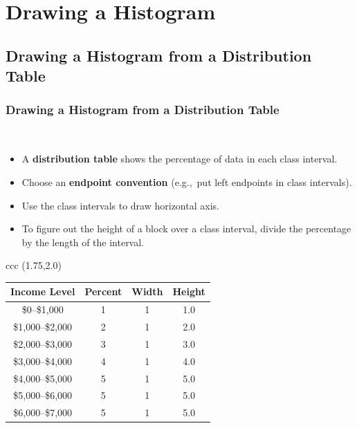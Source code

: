 \documentclass[t]{beamer}
\begin{document}
\section{Drawing a Histogram}

\subsection{Drawing a Histogram from a Distribution Table}
\begin{frame}[t]\frametitle{Drawing a Histogram from a Distribution Table}
{\ }\vspace{-20pt}

{\footnotesize
\begin{itemize}
\item A \textbf{\color{blue}distribution table} shows the percentage of data in each class interval. %
\item Choose an \textbf{endpoint convention} (e.g.,~put left endpoints in class intervals).
\item Use the class intervals to draw horizontal axis.
\item To figure out the height of a block over a class interval, divide the percentage by the length of the interval.\vspace{.075in}
\end{itemize}
}
{\setlength{\tabcolsep}{.2in}\begin{tabular}{ccc}
\newcommand{\C}{\hphantom{\color{white},}}
\newcommand{\Z}{\hphantom{0}}
  \rput(1.75,2.0){\scriptsize\setlength{\tabcolsep}{2pt}
  \begin{tabular}{cccc}
   \color{blue}Income Level & \hfill \color{blue} Percent & Width & Height\\[1pt]\hline
\color{blue}   \Z\Z\Z\C\Z\Z\$0--\$1,000\Z\Z & \color{blue}\Z1\vphantom{\large Y} & \Z1 & 1.0\\
\color{blue}   \Z\$1,000--\$2,000\Z     & \color{blue}\Z2 & \Z1 & 2.0\\
\color{blue}   \Z\$2,000--\$3,000\Z     & \color{blue}\Z3 & \Z1 & 3.0\\
\color{blue}   \Z\$3,000--\$4,000\Z     & \color{blue}\Z4 & \Z1 & 4.0\\
\color{blue}   \Z\$4,000--\$5,000\Z     & \color{blue}\Z5 & \Z1 & 5.0\\
\color{blue}   \Z\$5,000--\$6,000\Z     & \color{blue}\Z5 & \Z1 & 5.0\\
\color{blue}   \Z\$6,000--\$7,000\Z     & \color{blue}\Z5 & \Z1 & 5.0\\

\end{tabular}}
\end{tabular}}
\end{frame}
\end{document}
